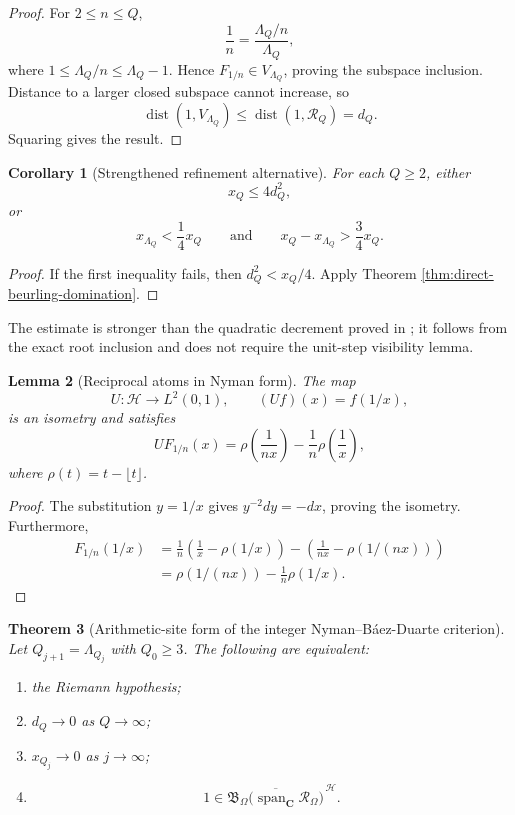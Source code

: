 \documentclass[11pt]{amsart}
\numberwithin{equation}{section}
\newtheorem{theorem}{Theorem}[section]
\newtheorem{corollary}[theorem]{Corollary}
\newtheorem{lemma}[theorem]{Lemma}
\theoremstyle{definition}
\newcommand{\C}{\mathbf C}
\newcommand{\cH}{\mathcal H}
\newcommand{\cR}{\mathcal R}
\begin{document}
\begin{proof}
For $2\leq n\leq Q$,
\[
\frac1n=\frac{\Lambda_Q/n}{\Lambda_Q},
\]
where $1\leq\Lambda_Q/n\leq\Lambda_Q-1$.  Hence
$F_{1/n}\in V_{\Lambda_Q}$, proving the subspace inclusion.  Distance to
a larger closed subspace cannot increase, so
\[
\operatorname{dist}(1,V_{\Lambda_Q})
\leq\operatorname{dist}(1,\cR_Q)=d_Q.
\]
Squaring gives the result.
\end{proof}

\begin{corollary}[Strengthened refinement alternative]
\label{cor:strong-refinement-alternative}
For each $Q\geq2$, either
\[
x_Q\leq4d_Q^2,
\]
or
\[
x_{\Lambda_Q}<\frac14x_Q
\qquad\text{and}\qquad
x_Q-x_{\Lambda_Q}>\frac34x_Q.
\]
\end{corollary}

\begin{proof}
If the first inequality fails, then $d_Q^2<x_Q/4$.  Apply Theorem
\ref{thm:direct-beurling-domination}.
\end{proof}

The estimate is stronger than the quadratic decrement proved in
\cite{Schultze}; it follows from the exact root inclusion and does not
require the unit-step visibility lemma.

\begin{lemma}[Reciprocal atoms in Nyman form]
\label{lem:nyman-form}
The map
\[
U:\cH\longrightarrow L^2(0,1),
\qquad
(Uf)(x)=f(1/x),
\]
is an isometry and satisfies
\[
UF_{1/n}(x)
=
\rho\!\left(\frac1{nx}\right)
-\frac1n\rho\!\left(\frac1x\right),
\]
where $\rho(t)=t-\lfloor t\rfloor$.
\end{lemma}

\begin{proof}
The substitution $y=1/x$ gives $y^{-2}dy=-dx$, proving the isometry.
Furthermore,
\[
\begin{aligned}
F_{1/n}(1/x)
&=\frac1n\left(\frac1x-\rho(1/x)\right)
 -\left(\frac1{nx}-\rho(1/(nx))\right)\\
&=\rho(1/(nx))-\frac1n\rho(1/x).
\end{aligned}
\]
\end{proof}

\begin{theorem}[Arithmetic-site form of the integer
Nyman--B\'aez-Duarte criterion]
\label{thm:arithmetic-site-nyman}
Let $Q_{j+1}=\Lambda_{Q_j}$ with $Q_0\geq3$.  The following are equivalent:
\begin{enumerate}[label=\textup{(\roman*)}]
\item the Riemann hypothesis;
\item $d_Q\to0$ as $Q\to\infty$;
\item $x_{Q_j}\to0$ as $j\to\infty$;
\item
\[
1\in
\overline{
\mathfrak B_\Omega
\bigl(\operatorname{span}_{\C}\mathscr R_\Omega\bigr)
}^{\,\cH}.
\]
\end{enumerate}
\end{theorem}
\end{document}

